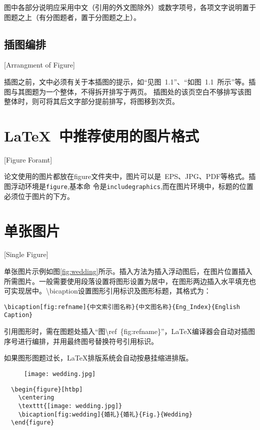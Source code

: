 图中各部分说明应采用中文（引用的外文图除外）或数字项号，各项文字说明置于图题之上（有分图题者，置于分图题之上）。

\subsection{插图编排}[Arrangment of Figure]

插图之前，文中必须有关于本插图的提示，如“见图~1.1”、“如图~1.1~所示”等。插图与其图题为一个整体，不得拆开排写于两页。
插图处的该页空白不够排写该图整体时，则可将其后文字部分提前排写，将图移到次页。

\section{LaTeX~中推荐使用的图片格式}[Figure Foramt]

论文使用的图片都放在figure文件夹中，图片可以是~EPS、JPG、PDF等格式。插图浮动环境是\texttt{figure},基本命
令是\texttt{includegraphics},而在图片环境中，标题的位置必须位于图片的下方。

\section{单张图片}[Single Figure]

单张图片示例如图\ref{fig:wedding}所示。插入方法为插入浮动图后，在图片位置插入所需图片。一般需要使用段落设置将图形设置为居中，在图形两边插入水平填充也可实现居中。\textbackslash bicaption设置图形引用标识及图形标题，其格式为：

\begin{lstlisting}
\bicaption[fig:refname]{中文索引图名称}{中文图名称}{Eng_Index}{English Caption}
\end{lstlisting}

 引用图形时，需在图题处插入“图\textbackslash ref~\{fig:refname\}”，\LaTeX{}编译器会自动对插图序号进行编排，并用最终图号替换符号引用标识。

 如果图形图题过长，\LaTeX{}排版系统会自动按悬挂缩进排版。

\begin{figure}[htbp]
  \centering
  \texttt{[image: wedding.jpg]}
\end{figure}

\begin{lstlisting}
  \begin{figure}[htbp]
    \centering
    \texttt{[image: wedding.jpg]}
    \bicaption[fig:wedding]{婚礼}{婚礼}{Fig.}{Wedding}
  \end{figure}
\end{lstlisting}


